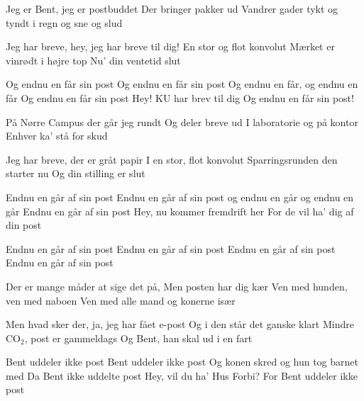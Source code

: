 \documentclass[a4paper,11pt]{article}
\begin{document}
\begin{song}
Jeg er Bent, jeg er postbuddet
Der bringer pakker ud
Vandrer gader tykt og tyndt 
i regn og sne og slud


Jeg har breve, hey, jeg har breve til dig!
En stor og flot konvolut
Mærket er vinrødt i højre top
Nu’ din ventetid slut


Og endnu en får sin post
Og endnu en får sin post
Og endnu en får, og endnu en får
Og endnu en får sin post
Hey! KU har brev til dig
Og endnu en får sin post!


På Nørre Campus der går jeg rundt
Og deler breve ud
I laboratorie og på kontor
Enhver ka’ stå for skud 


Jeg har breve, der er gråt papir 
I en stor, flot konvolut
Sparringsrunden den starter nu
Og din stilling er slut


Endnu en går af sin post
Endnu en går af sin post
og endnu en går og endnu en går
Endnu en går af sin post
Hey, nu kommer fremdrift her
For de vil ha' dig af din post

Endnu en går af sin post
Endnu en går af sin post
Endnu en går af sin post
Endnu en går af sin post

Der er mange måder at sige det 
på,
Men posten har dig kær
Ven med hunden, ven med naboen
Ven med alle mand og konerne 
især

Men hvad sker der, ja, jeg har fået e-post
Og i den står det ganske klart
Mindre CO$_2$, post er gammeldags
Og Bent, han skal ud i en fart

Bent uddeler ikke post
Bent uddeler ikke post
Og konen skred og hun tog barnet med
Da Bent ikke uddelte post
Hey, vil du ha’ Hus Forbi?
For Bent uddeler ikke post

\end{song}
\end{document}
